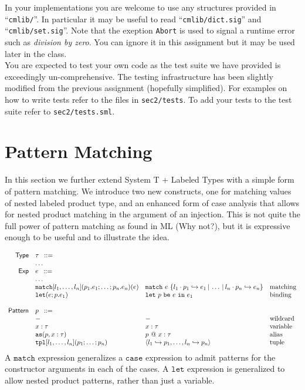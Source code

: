 \documentclass[11pt]{article}
\makeatletter
\newcommand{\ms}[1]{\ensuremath{\mathsf{#1}}}
\newcommand{\irl}[1]{\mathtt{#1}}
\newcommand{\pair}[2]{\langle #1, #2 \rangle}
\newcommand{\goesto}{\hookrightarrow}
\newcommand{\hra}{\hookrightarrow}
\newcommand{\por}{\hspace*{.2em}|\hspace*{.2em}}
\newcommand{\letbind}[3]{\irl{let}~#1~\irl{be}~#2~\irl{in}~#3}
\newcommand{\match}[2]{\irl{match}~#1~\{#2\}}
\newcommand{\npat}{l_1\cdot p_1\goesto e_1 \por \dots \por l_n\cdot p_n\goesto e_n}
\newcommand{\nmatch}[1]{\match{#1}{\npat}}
\newcommand{\alias}[2]{#1~@~#2}
\makeatother
\begin{document}
In your implementations you are welcome to use any structures provided
in ``\texttt{cmlib/}''. In particular it may be useful to read
``\texttt{cmlib/dict.sig}'' and ``\texttt{cmlib/set.sig}''. Note that
the exeption \verb|Abort| is used to signal a runtime error
such as \emph{division by zero}. You can ignore it in this assignment
but it may be used later in the class.\\

You are expected to test your own code as the test suite we have provided is
exceedingly un-comprehensive. The testing infrastructure has been slightly
modified from the previous assignment (hopefully simplified). For examples on
how to write tests refer to the files in \verb|sec2/tests|. To add your
tests to the test suite refer to \verb|sec2/tests.sml|.


\section{Pattern Matching}

In this section we further extend System T + Labeled Types with a
simple form of pattern matching.  We introduce two new constructs, one
for matching values of nested labeled product type, and an enhanced
form of case analysis that allows for nested product matching in the
argument of an injection.  This is not quite the full power of pattern
matching as found in ML (Why not?), but it is expressive enough to be
useful and to illustrate the idea.

\[
\begin{array}{r l l l l l}
\ms{Type}
	&\tau \,\,\, ::=	\\
        & \dots  \\
\ms{Exp}
        & e \,\,\, ::= \\
        & \ldots \\
        & \irl{match}[l_1,\dots,l_n](p_1.e_1;\dots; p_n.e_n)(e)  & \nmatch{e} & \text{matching}\\
	& \irl{let}(e;p.e_1)			& \letbind{p}{e}{e_1}			& \text{binding}\\
        \\
\ms{Pattern}
	& p \,\,\, ::= \\
        &  \--						& \--						& \text{wildcard}\\
	& x:\tau					& x:\tau					& \text{variable}\\
	& \irl{as}(p,x:\tau) 			& \alias{p}{x:\tau} 			& \text{alias}\\
	& \irl{tpl}[l_1,\dots,l_n](p_1;\dots;p_n)    & \pair{l_1\hra p_1}{\dots,l_n\hra p_n} 	& \text {tuple}
\end{array}
\]
A $\irl{match}$ expression generalizes a $\irl{case}$ expression to admit patterns for the constructor arguments in each of
the cases.  A $\irl{let}$ expression is generalized to allow nested product patterns, rather than just a variable.
\end{document}
